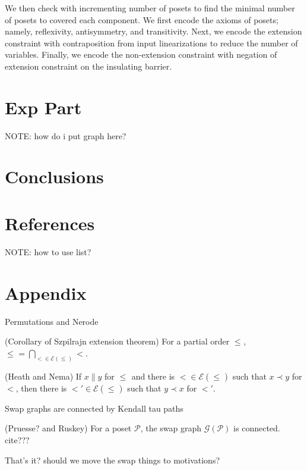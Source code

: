 \documentclass[12pt]{llncs}
\let\oldleq\leq
\renewcommand{\leq}[1][]{\oldleq_{#1}}
\newcommand{\poset}[1]{\mathcal{#1}}
\newcommand{\incomp}{\parallel}
\newcommand{\covered}{\prec}
\begin{document}
We then check with incrementing number of posets to find the minimal number of posets to covered each component. We first encode the axioms of posets; namely, reflexivity, antisymmetry, and transitivity. Next, we encode the extension constraint with contraposition from input linearizations to reduce the number of variables. Finally, we encode the non-extension constraint with negation of extension constraint on the insulating barrier.

\section{Exp Part}
NOTE: how do i put graph here?

\section{Conclusions}

\section{References}
NOTE: how to use list?

\section{Appendix}

\begin{theorem}
    Permutations and Nerode
\end{theorem}

\begin{theorem}
    (Corollary of Szpilrajn extension theorem) For a partial order $\leq$, $\leq = \bigcap_{< \in \mathcal{E}(\leq)} <$.
\end{theorem}

\begin{theorem}
    (Heath and Nema) If $x \incomp y$ for $\leq$ and there is $< \in \mathcal{E}(\leq)$ such that $x \covered y$ for $<$, then there is $<' \in \mathcal{E}(\leq)$ such that $y \covered x$ for $<'$.
\end{theorem}

\begin{theorem}
    Swap graphs are connected by Kendall tau paths
\end{theorem}

\begin{theorem}
    \label{theorem:szpilrajn}
\end{theorem}

\begin{theorem}
    (Pruesse? and Ruskey) For a poset $\poset{P}$, the swap graph $\mathcal{G}(\poset{P})$ is connected. cite???
\end{theorem}

That's it? should we move the swap things to motivations?
\end{document}
